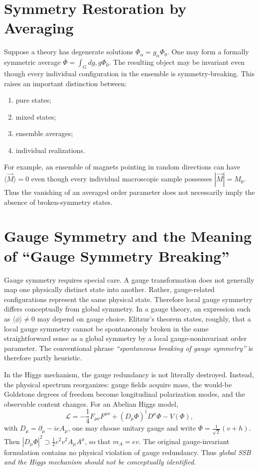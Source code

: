 \section{Symmetry Restoration by Averaging}
Suppose a theory has degenerate solutions $\Phi_\alpha=g_\alpha\Phi_0$.
One may form a formally symmetric average
$\overline{\Phi}=\int_G dg,g\Phi_0$.
The resulting object may be invariant even though every individual
configuration in the ensemble is symmetry-breaking.
This raises an important distinction between:
\begin{enumerate}
\item pure states;
\item mixed states;
\item ensemble averages;
\item individual realizations.
\end{enumerate}
For example, an ensemble of magnets pointing in random directions can have
$\langle\vec{M}\rangle=0$ even though every individual macroscopic sample 
possesses $|\vec{M}|=M_0$.
Thus the vanishing of an averaged order parameter does not necessarily imply
the absence of broken-symmetry states.

\section{Gauge Symmetry and the Meaning of ``Gauge Symmetry Breaking''}
Gauge symmetry requires special care.
A gauge transformation does not generally map one physically distinct state
into another.  Rather, gauge-related configurations represent the same physical
state.
Therefore local gauge symmetry differs conceptually from global symmetry.
In a gauge theory, an expression such as
$\langle\phi\rangle\neq 0$ may depend on gauge choice.
Elitzur's theorem states, roughly, that a local gauge symmetry cannot be
spontaneously broken in the same straightforward sense as a global symmetry by
a local gauge-noninvariant order parameter.
The conventional phrase \emph{``spontaneous breaking of gauge symmetry''}
is therefore partly heuristic.

In the Higgs mechanism, the gauge redundancy is not literally destroyed.
Instead, the physical spectrum reorganizes: gauge fields acquire mass, the
would-be Goldstone degrees of freedom become longitudinal polarization modes,
and the observable content changes.
For an Abelian Higgs model,
\[\mathcal{L}=-\frac14F_{\mu\nu}F^{\mu\nu}+(D_\mu\Phi)^\dagger D^\mu\Phi
-V(\Phi),\]
with $D_\mu=\partial_\mu-ieA_\mu$,
one may choose unitary gauge and write
$\Phi=\frac{1}{\sqrt2}(v+h)$. Then $|D_\mu\Phi|^2\supset
\frac12e^2v^2A_\mu A^\mu$,
so that $m_A=ev$.
The original gauge-invariant formulation contains no physical violation of gauge redundancy.
Thus \emph{global SSB and the Higgs mechanism should not be conceptually identified}.

